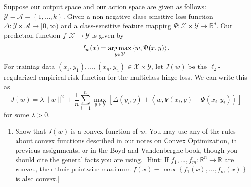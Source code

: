 \documentclass{article}
\theoremstyle{plain}
\theoremstyle{definition}
\begin{document}
Suppose our output space and our action space are given as follows:
$\mathcal{Y}=\mathcal{A}=\left\{ 1,\ldots,k\right\} $. Given a non-negative class-sensitive
loss function $\Delta:\mathcal{Y}\times\mathcal{A}\to[0,\infty)$ and a class-sensitive
feature mapping $\Psi:\mathcal{X}\times\mathcal{Y}\to\mathbb{R}^{d}$. Our prediction
function $f:\mathcal{X}\to\mathcal{Y}$ is given by
\[
f_{w}(x)=\argmax_{y\in\mathcal{Y}}\left\langle w,\Psi(x,y)\right\rangle .
\]
For training data $(x_{1},y_{1}),\ldots,(x_{n},y_{n})\in\mathcal{X}\times\mathcal{Y}$,
let $J(w)$ be the $\ell_{2}$-regularized empirical risk function
for the multiclass hinge loss. We can write this as
\[
J(w)=\lambda\|w\|^{2}+\frac{1}{n}\sum_{i=1}^{n}\max_{y\in\mathcal{Y}}\left[\Delta\left(y_{i},y\right)+\left\langle w,\Psi(x_{i},y)-\Psi(x_{i},y_{i})\right\rangle \right]
\]
for some $\lambda>0$.
\begin{enumerate}
  \setcounter{enumi}{\value{saveenum}}
\item Show that $J(w)$ is a convex function of $w$. You
may use any of the rules about convex functions described in our \href{https://davidrosenberg.github.io/mlcourse/Notes/convex-optimization.pdf}{notes on Convex Optimization},
in previous assignments, or in the Boyd and Vandenberghe book, though
you should cite the general facts you are using. {[}Hint: If $f_{1},\ldots,f_{m}:\mathbb{R}^{n}\to\mathbb{R}$
are convex, then their pointwise maximum $f(x)=\max\left\{ f_{1}(x),\ldots,f_{m}(x)\right\} $
is also convex.{]}


\end{enumerate}
\end{document}
